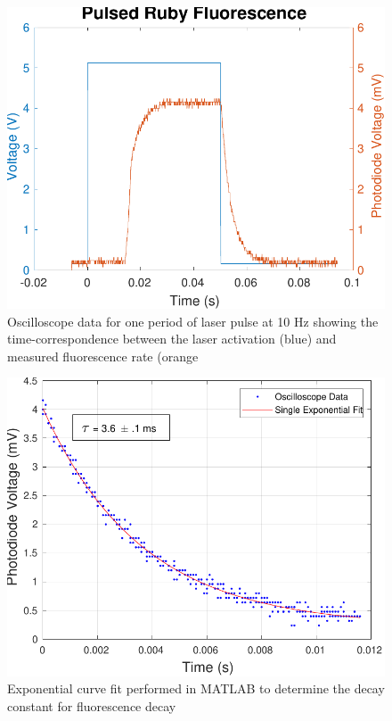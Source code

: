 \documentclass[11pt, a4paper, twocolumn]{article}
\begin{document}
\begin{figure}[H]
\includegraphics[width=\linewidth]{fluorescencePeriod.pdf}
\caption{Oscilloscope data for one period of laser pulse at 10 Hz showing the time-correspondence between the laser activation (blue) and measured fluorescence rate (orange}
\label{fig:intensities}
\end{figure}

\begin{figure}[H]
\includegraphics[width=\linewidth]{decayFit.pdf}
\caption{Exponential curve fit performed in MATLAB to determine the decay constant for fluorescence decay
}
\label{fig:populationInversion}
\end{figure}
\end{document}
